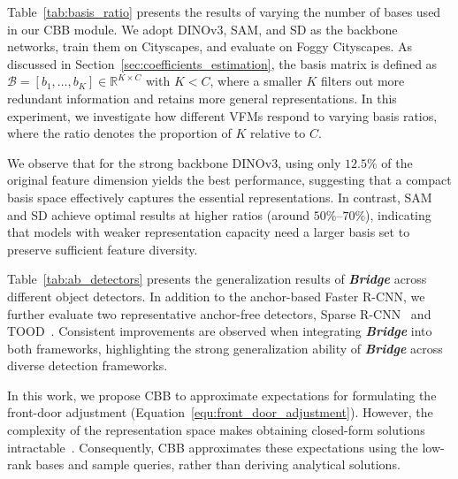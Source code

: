 \vspace{4pt}
Table~\ref{tab:basis_ratio} presents the results of varying the number of bases used in our CBB module. 
We adopt DINOv3, SAM, and SD as the backbone networks, train them on Cityscapes, and evaluate on Foggy Cityscapes.
As discussed in Section~\ref{sec:coefficients_estimation}, the basis matrix is defined as $\mathcal{B} = [b_1, \dots, b_K] \in \mathbb{R}^{K \times C}$ with $K < C$, where a smaller $K$ filters out more redundant information and retains more general representations. In this experiment, we investigate how different VFMs respond to varying basis ratios, where the ratio denotes the proportion of $K$ relative to $C$.

We observe that for the strong backbone DINOv3, using only $12.5\%$ of the original feature dimension yields the best performance, suggesting that a compact basis space effectively captures the essential representations. In contrast, SAM and SD achieve optimal results at higher ratios (around $50\%$–$70\%$), indicating that models with weaker representation capacity need a larger basis set to preserve sufficient feature diversity.

\vspace{4pt}
Table~\ref{tab:ab_detectors} presents the generalization results of \textbf{\textit{Bridge}} across different object detectors.
In addition to the anchor-based Faster R-CNN, we further evaluate two representative anchor-free detectors, Sparse R-CNN~\cite{sun2021sparse} and TOOD~\cite{feng2021tood}.
Consistent improvements are observed when integrating \textbf{\textit{Bridge}} into both frameworks, highlighting the strong generalization ability of \textbf{\textit{Bridge}} across diverse detection frameworks.



\vspace{4pt}
In this work, we propose CBB to approximate expectations for formulating the front-door adjustment (Equation~\ref{equ:front_door_adjustment}). However, the complexity of the representation space makes obtaining closed-form solutions intractable~\cite{wang2024vision,yang2021deconfounded}. Consequently, CBB approximates these expectations using the low-rank bases and sample queries, rather than deriving analytical solutions. 